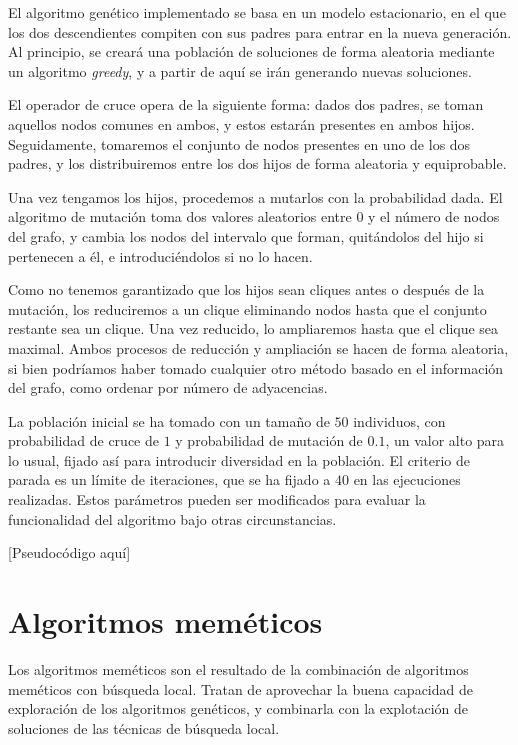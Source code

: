 El algoritmo genético implementado se basa en un modelo estacionario, en el que
los dos descendientes compiten con sus padres para entrar en la nueva generación.
Al principio, se creará una población de soluciones de forma aleatoria mediante
un algoritmo \textit{greedy}, y a partir de aquí se irán generando nuevas soluciones.

El operador de cruce opera de la siguiente forma: dados dos padres, se toman aquellos
nodos comunes en ambos, y estos estarán presentes en ambos hijos. Seguidamente,
tomaremos el conjunto de nodos presentes en uno de los dos padres, y los distribuiremos
entre los dos hijos de forma aleatoria y equiprobable.

Una vez tengamos los hijos, procedemos a mutarlos con la probabilidad dada. El
algoritmo de mutación toma dos valores aleatorios entre $0$ y el número de nodos
del grafo, y cambia los nodos del intervalo que forman, quitándolos del hijo si
pertenecen a él, e introduciéndolos si no lo hacen.

Como no tenemos garantizado que los hijos sean cliques antes o después de la mutación,
los reduciremos a un clique eliminando nodos hasta que el conjunto restante sea un
clique. Una vez reducido, lo ampliaremos hasta que el clique sea maximal.
Ambos procesos de reducción y ampliación se hacen de forma aleatoria, si bien
podríamos haber tomado cualquier otro método basado en el información del grafo,
como ordenar por número de adyacencias.

La población inicial se ha tomado con un tamaño de $50$ individuos, con probabilidad
de cruce de $1$ y probabilidad de mutación de $0.1$, un valor alto para lo usual,
fijado así para introducir diversidad en la población. El criterio de parada es un
límite de iteraciones, que se ha fijado a $40$ en las ejecuciones realizadas.
Estos parámetros pueden ser modificados para evaluar la funcionalidad del algoritmo
bajo otras circunstancias.

[Pseudocódigo aquí]

\section{Algoritmos meméticos}

Los algoritmos meméticos son el resultado de la combinación de algoritmos meméticos
con búsqueda local. Tratan de aprovechar la buena capacidad de exploración de los
algoritmos genéticos, y combinarla con la explotación de soluciones de las técnicas
de búsqueda local.

